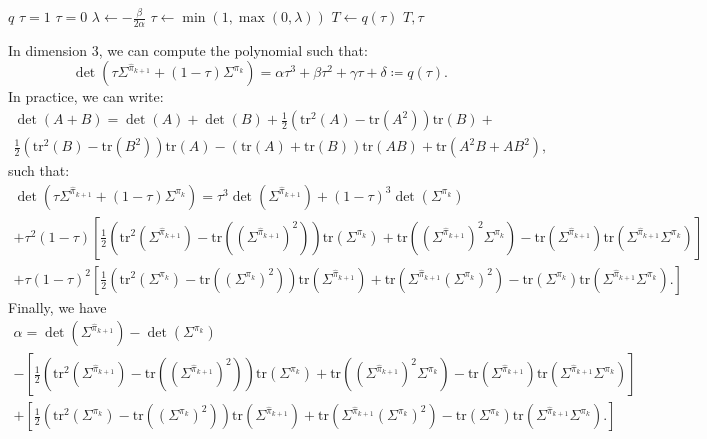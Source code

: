 \documentclass{article}
\newcommand{\1}{\mathbf{1}}
\theoremstyle{definition}
\theoremstyle{remark}
\begin{document}
\begin{appendices}
\begin{algorithm}
\caption{Line search for the DGW and CGW problems (2D)}\label{alg:line_DGW2}
\begin{algorithmic}[1]
\Require$q$
\State $\tau = 1$
\Else 
\State $\tau = 0$
\EndIf
\Else
\State $\lambda\gets -\frac{\beta}{2\alpha}$
\State $\tau\gets \min(1,\max(0, \lambda)) $
\EndIf
\State $T\gets q(\tau)$
\State\Return $T,\tau$
\end{algorithmic}
\end{algorithm}


In dimension 3, we can compute the polynomial such that:
\[\det(\tau\Sigma^{\hat{\pi}_{k+1}}+(1-\tau)\Sigma^{\pi_{k}}) = \alpha\tau^3+\beta\tau^2+\gamma\tau+\delta \coloneqq q(\tau).\]
In practice, we can write:
\begin{multline*}
    \det(A+B)=\det(A)+\det(B)+\frac{1}{2}(\mathrm{tr}^2(A)-\mathrm{tr}(A^2))\mathrm{tr}(B)+\\\frac{1}{2}(\mathrm{tr}^2(B)-\mathrm{tr}(B^2))\mathrm{tr}(A)
    -(\mathrm{tr}(A)+\mathrm{tr}(B))\mathrm{tr}(AB)+\mathrm{tr}(A^2B+AB^2),
\end{multline*}
such that:
\begin{multline*}
    \det(\tau\Sigma^{\hat{\pi}_{k+1}}+(1-\tau)\Sigma^{\pi_{k}})=\tau^3\det(\Sigma^{\hat{\pi}_{k+1}})+(1-\tau)^3\det(\Sigma^{\pi_{k}})\\+
    \tau^2(1-\tau)\left[\frac{1}{2}(\mathrm{tr}^2(\Sigma^{\hat{\pi}_{k+1}})-\mathrm{tr}((\Sigma^{\hat{\pi}_{k+1}})^2))\mathrm{tr}(\Sigma^{\pi_{k}})+\mathrm{tr}((\Sigma^{\hat{\pi}_{k+1}})^2 \Sigma^{\pi_{k}})-\mathrm{tr}(\Sigma^{\hat{\pi}_{k+1}})\mathrm{tr}(\Sigma^{\hat{\pi}_{k+1}}\Sigma^{\pi_{k}})\right]\\ +\tau(1-\tau)^2\left[\frac{1}{2}(\mathrm{tr}^2(\Sigma^{\pi_{k}})-\mathrm{tr}((\Sigma^{\pi_{k}})^2))\mathrm{tr}(\Sigma^{\hat{\pi}_{k+1}})+\mathrm{tr}(\Sigma^{\hat{\pi}_{k+1}}(\Sigma^{\pi_{k}})^2) - \mathrm{tr}(\Sigma^{\pi_{k}})\mathrm{tr}(\Sigma^{\hat{\pi}_{k+1}}\Sigma^{\pi_{k}}).\right]
\end{multline*}
Finally, we have 
\begin{multline*}
    \alpha = \det(\Sigma^{\hat{\pi}_{k+1}}) - \det(\Sigma^{\pi_{k}}) \\-\left[\frac{1}{2}(\mathrm{tr}^2(\Sigma^{\hat{\pi}_{k+1}})-\mathrm{tr}((\Sigma^{\hat{\pi}_{k+1}})^2))\mathrm{tr}(\Sigma^{\pi_{k}})+\mathrm{tr}((\Sigma^{\hat{\pi}_{k+1}})^2 \Sigma^{\pi_{k}})-\mathrm{tr}(\Sigma^{\hat{\pi}_{k+1}})\mathrm{tr}(\Sigma^{\hat{\pi}_{k+1}}\Sigma^{\pi_{k}})\right] \\+\left[\frac{1}{2}(\mathrm{tr}^2(\Sigma^{\pi_{k}})-\mathrm{tr}((\Sigma^{\pi_{k}})^2))\mathrm{tr}(\Sigma^{\hat{\pi}_{k+1}})+\mathrm{tr}(\Sigma^{\hat{\pi}_{k+1}}(\Sigma^{\pi_{k}})^2) - \mathrm{tr}(\Sigma^{\pi_{k}})\mathrm{tr}(\Sigma^{\hat{\pi}_{k+1}}\Sigma^{\pi_{k}}).\right]

\end{multline*}
\end{appendices}
\end{document}

